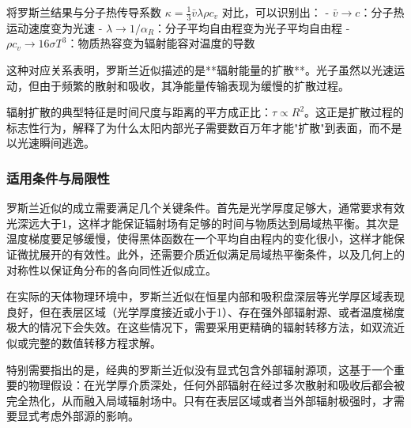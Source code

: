 将罗斯兰结果与分子热传导系数 $\kappa = \frac{1}{3} \bar{v} \lambda \rho c_v$ 对比，可以识别出：
- $\bar{v} \rightarrow c$：分子热运动速度变为光速
- $\lambda \rightarrow 1/\alpha_R$：分子平均自由程变为光子平均自由程  
- $\rho c_v \rightarrow 16\sigma T^3$：物质热容变为辐射能容对温度的导数

这种对应关系表明，罗斯兰近似描述的是**辐射能量的扩散**。光子虽然以光速运动，但由于频繁的散射和吸收，其净能量传输表现为缓慢的扩散过程。

辐射扩散的典型特征是时间尺度与距离的平方成正比：$\tau \propto R^2$。这正是扩散过程的标志性行为，解释了为什么太阳内部光子需要数百万年才能"扩散"到表面，而不是以光速瞬间逃逸。

\subsubsection*{适用条件与局限性}

罗斯兰近似的成立需要满足几个关键条件。首先是光学厚度足够大，通常要求有效光深远大于1，这样才能保证辐射场有足够的时间与物质达到局域热平衡。其次是温度梯度要足够缓慢，使得黑体函数在一个平均自由程内的变化很小，这样才能保证微扰展开的有效性。此外，还需要介质近似满足局域热平衡条件，以及几何上的对称性以保证角分布的各向同性近似成立。

在实际的天体物理环境中，罗斯兰近似在恒星内部和吸积盘深层等光学厚区域表现良好，但在表层区域（光学厚度接近或小于1）、存在强外部辐射源、或者温度梯度极大的情况下会失效。在这些情况下，需要采用更精确的辐射转移方法，如双流近似或完整的数值转移方程求解。

特别需要指出的是，经典的罗斯兰近似没有显式包含外部辐射源项，这基于一个重要的物理假设：在光学厚介质深处，任何外部辐射在经过多次散射和吸收后都会被完全热化，从而融入局域辐射场中。只有在表层区域或者当外部辐射极强时，才需要显式考虑外部源的影响。
